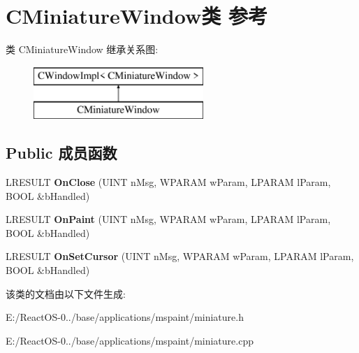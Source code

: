 \hypertarget{class_c_miniature_window}{}\section{C\+Miniature\+Window类 参考}
\label{class_c_miniature_window}
类 C\+Miniature\+Window 继承关系图\+:\begin{figure}[H]
\begin{center}
\leavevmode
\includegraphics[height=2.000000cm]{class_c_miniature_window}
\end{center}
\end{figure}
\subsection*{Public 成员函数}
\begin{DoxyCompactItemize}
\item 
\mbox{\label{class_c_miniature_window_a953e25d38b8004910ee5fd2cbcf290a7}} 
L\+R\+E\+S\+U\+LT {\bfseries On\+Close} (U\+I\+NT n\+Msg, W\+P\+A\+R\+AM w\+Param, L\+P\+A\+R\+AM l\+Param, B\+O\+OL \&b\+Handled)
\item 
\mbox{\label{class_c_miniature_window_ac6e1c8abc327eaf69d3a22048a143325}} 
L\+R\+E\+S\+U\+LT {\bfseries On\+Paint} (U\+I\+NT n\+Msg, W\+P\+A\+R\+AM w\+Param, L\+P\+A\+R\+AM l\+Param, B\+O\+OL \&b\+Handled)
\item 
\mbox{\label{class_c_miniature_window_a8734314550b188a0f07a51810eaf4555}} 
L\+R\+E\+S\+U\+LT {\bfseries On\+Set\+Cursor} (U\+I\+NT n\+Msg, W\+P\+A\+R\+AM w\+Param, L\+P\+A\+R\+AM l\+Param, B\+O\+OL \&b\+Handled)
\end{DoxyCompactItemize}


该类的文档由以下文件生成\+:\begin{DoxyCompactItemize}
\item 
E\+:/\+React\+O\+S-\/0../base/applications/mspaint/miniature.\+h\item 
E\+:/\+React\+O\+S-\/0../base/applications/mspaint/miniature.\+cpp\end{DoxyCompactItemize}
